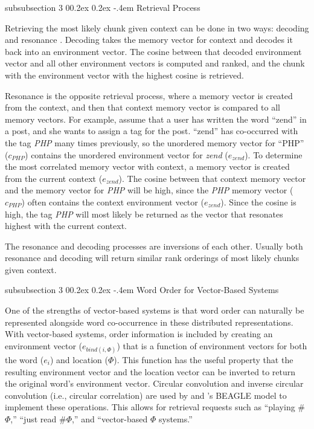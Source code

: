 \documentclass[man,floatsintext,donotrepeattitle]{apa6}
\makeatletter
\renewcommand{\subsubsection}{%
  \@startsection
  {subsubsection}%
  {3}%
  {\parindent}%
  {0\baselineskip \@plus 0.2ex \@minus 0.2ex}%
  {-.4em}%
  {\normalfont\normalsize\bfseries\addperi}}
\makeatother
\begin{document}
\subsubsection{Retrieval Process}

Retrieving the most likely chunk given context can be done in two ways: decoding and resonance \parencite{Jones2007}.
Decoding takes the memory vector for context and decodes it back into an environment vector.
The cosine between that decoded environment vector and all other environment vectors is computed and ranked, and the chunk with the environment vector with the highest cosine is retrieved.

Resonance is the opposite retrieval process, where a memory vector is created from the context, and then that context memory vector is compared to all memory vectors.
For example, assume that a user has written the word ``zend'' in a post, and she wants to assign a tag for the post.
``zend'' has co-occurred with the tag \emph{PHP} many times previously, so the unordered memory vector for ``PHP'' ($c_{\mathit{PHP}}$) contains the unordered environment vector for \emph{zend} ($e_{zend}$).
To determine the most correlated memory vector with context, a memory vector is created from the current context ($e_{zend}$).
The cosine between that context memory vector and the memory vector for \emph{PHP} will be high, since the \emph{PHP} memory vector ($c_{\mathit{PHP}}$) often contains the context environment vector ($e_{zend}$).
Since the cosine is high, the tag \emph{PHP} will most likely be returned as the vector that resonates highest with the current context.

The resonance and decoding processes are inversions of each other.
Usually both resonance and decoding will return similar rank orderings of most likely chunks given context.

\subsubsection{Word Order for Vector-Based Systems}

One of the strengths of vector-based systems is that word order can naturally be represented alongside word co-occurrence in these distributed representations.
With vector-based systems, order information is included by creating an environment vector ($e_{bind(i,\Phi)}$) that is a function of environment vectors for both the word ($e_{i}$) and location ($\Phi$).
This function has the useful property that the resulting environment vector and the location vector can be inverted to return the original word's environment vector.
Circular convolution and inverse circular convolution (i.e., circular correlation) are used by \textcite{Plate1995} and \textcite{Jones2007}'s BEAGLE model to implement these operations.
This allows for retrieval requests such as ``playing \#$\Phi$,'' ``just read \#$\Phi$,'' and ``vector-based $\Phi$ systems.''
\end{document}
